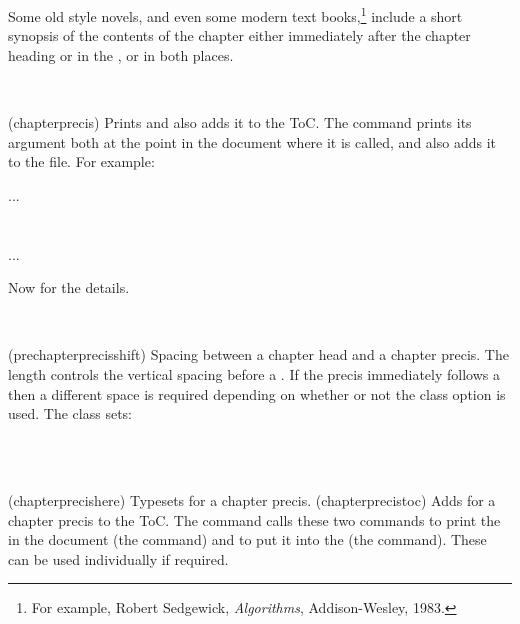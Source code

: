 

   Some old style novels, and even some modern text 
 books,\footnote{For example, Robert Sedgewick, \textit{Algorithms},
 Addison-Wesley, 1983.} include a short synopsis of the contents of 
 the chapter either immediately
 after the chapter heading or in the \toc, or in both places.

\begin{syntax}
\cmd{\chapterprecis} \\
\end{syntax}
\glossary(chapterprecis)%
  {}%
  {Prints  and also adds it to the ToC.}
     The command \cmd{\chapterprecis} prints its argument 
 both at the
 point in the document where it is called, and also adds it to the 
 file. For example:
 \begin{lcode}
 ...
 \chapter{}%
 ...
 \end{lcode}

    Now for the details.

\begin{syntax}
\lnc{\prechapterprecisshift} \\
\end{syntax}
\glossary(prechapterprecisshift)%
  {}%
  {Spacing between a chapter head and a chapter precis.}
The length \lnc{\prechapterprecisshift} controls the vertical spacing before
a \cmd{\chapterprecis}. If the precis immediately follows a \cmd{\chapter}
then a different space is required depending on whether or not the
 class option is used. The class sets:
\begin{lcode}
\ifartopt
  \setlength{\prechapterprecisshift}{0pt}
\else
  \setlength{\prechapterprecisshift}{-2\baselineskip}
\fi
\end{lcode}


\begin{syntax}
\cmd{\chapterprecishere} \\
\cmd{\chapterprecistoc} \\
\end{syntax}
\glossary(chapterprecishere)%
  {}%
  {Typesets  for a chapter precis.}
\glossary(chapterprecistoc)%
  {}%
  {Adds  for a chapter precis to the ToC.}
 The \cmd{\chapterprecis} command calls these two commands to print the
  in the document (the \cmd{\chapterprecishere} command) 
 and to put it into the \toc{} (the \cmd{\chapterprecistoc} command). 
 These can be used individually if required.

